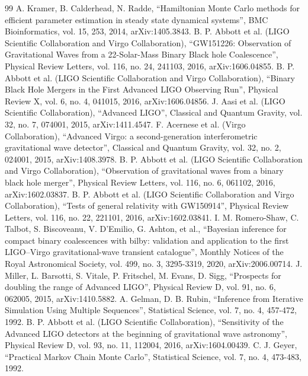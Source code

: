 \documentclass[12pt]{article}
\begin{document}
\begin{thebibliography}{99}
  A. Kramer, B. Calderhead, N. Radde,
  ``Hamiltonian Monte Carlo methods for efficient parameter estimation in steady state dynamical systems'',
  BMC Bioinformatics, vol. 15, 253, 2014,
  arXiv:1405.3843.
  B. P. Abbott et al. (LIGO Scientific Collaboration and Virgo Collaboration),
  ``GW151226: Observation of Gravitational Waves from a 22-Solar-Mass Binary Black hole Coalescence'',
  Physical Review Letters, vol. 116, no. 24, 241103, 2016,
  arXiv:1606.04855.
  B. P. Abbott et al. (LIGO Scientific Collaboration and Virgo Collaboration),
  ``Binary Black Hole Mergers in the First Advanced LIGO Observing Run'',
  Physical Review X, vol. 6, no. 4, 041015, 2016,
  arXiv:1606.04856.
  J. Aasi et al. (LIGO Scientific Collaboration),
  ``Advanced LIGO'',
  Classical and Quantum Gravity, vol. 32, no. 7, 074001, 2015,
  arXiv:1411.4547.
  F. Acernese et al. (Virgo Collaboration),
  ``Advanced Virgo: a second-generation interferometric gravitational wave detector'',
  Classical and Quantum Gravity, vol. 32, no. 2, 024001, 2015,
  arXiv:1408.3978.
  B. P. Abbott et al. (LIGO Scientific Collaboration and Virgo Collaboration),
  ``Observation of gravitational waves from a binary black hole merger'',
  Physical Review Letters, vol. 116, no. 6, 061102, 2016,
  arXiv:1602.03837.
  B. P. Abbott et al. (LIGO Scientific Collaboration and Virgo Collaboration),
  ``Tests of general relativity with GW150914'',
  Physical Review Letters, vol. 116, no. 22, 221101, 2016,
  arXiv:1602.03841.
  I. M. Romero-Shaw, C. Talbot, S. Biscoveanu, V. D'Emilio, G. Ashton, et al.,
  ``Bayesian inference for compact binary coalescences with bilby: validation and application to the first LIGO--Virgo gravitational-wave transient catalogue'',
  Monthly Notices of the Royal Astronomical Society, vol. 499, no. 3, 3295-3319, 2020,
  arXiv:2006.00714.
  J. Miller, L. Barsotti, S. Vitale, P. Fritschel, M. Evans, D. Sigg,
  ``Prospects for doubling the range of Advanced LIGO'',
  Physical Review D, vol. 91, no. 6, 062005, 2015,
  arXiv:1410.5882.
  A. Gelman, D. B. Rubin,
  ``Inference from Iterative Simulation Using Multiple Sequences'',
  Statistical Science, vol. 7, no. 4, 457-472, 1992.
  B. P. Abbott et al. (LIGO Scientific Collaboration),
  ``Sensitivity of the Advanced LIGO detectors at the beginning of gravitational wave astronomy'',
  Physical Review D, vol. 93, no. 11, 112004, 2016,
  arXiv:1604.00439.
  C. J. Geyer,
  ``Practical Markov Chain Monte Carlo'',
  Statistical Science, vol. 7, no. 4, 473-483, 1992.


\end{thebibliography}
\end{document}
